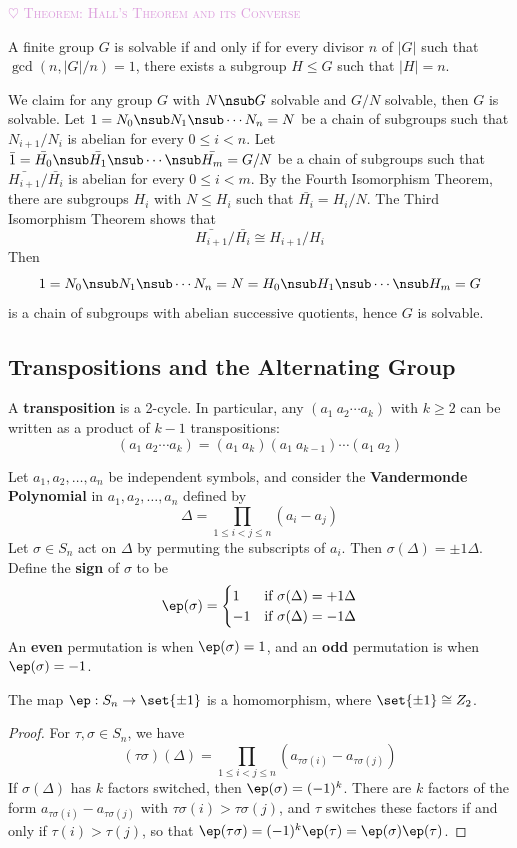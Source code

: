 \noindent \textcolor{Plum}{{\large$\heartsuit$} \squad \textsc{Theorem: Hall's Theorem and its Converse}}

A finite group $G$ is solvable if and only if for every divisor $n$ of $|G|$ such that $\gcd(n, |G|/n) = 1$, there exists a subgroup $H \leq G$ such that $|H| = n$.

\ex We claim for any group $G$ with $N \nsub G$ solvable and $G/N$ solvable, then $G$ is solvable. Let $1 = N_0 \nsub N_1 \nsub \cdots N_n = N$ be a chain of subgroups such that $N_{i + 1}/N_i$ is abelian for every $0 \leq i < n$. Let $\bar 1 = \bar{H_0} \nsub \bar{H_1} \nsub \cdots \nsub \bar{H_m} = G/N$ be a chain of subgroups such that $\bar{H_{i + 1}}/\bar{H_i}$ is abelian for every $0 \leq i < m$. By the Fourth Isomorphism Theorem, there are subgroups $H_i$ with $N \leq H_i$ such that $\bar{H_i} = H_i/N$. The Third Isomorphism Theorem shows that
\[\bar{H_{i + 1}}/\bar{H_i} \cong H_{i + 1}/H_i\]
Then
\[1 = N_0 \nsub N_1 \nsub \cdots N_n = N = H_0 \nsub H_1 \nsub \cdots \nsub H_m = G\]
is a chain of subgroups with abelian successive quotients, hence $G$ is solvable.

\newpage

\subsection{Transpositions and the Alternating Group} \label{sec3.5}

 A \textbf{transposition} is a 2-cycle. In particular, any $(a_1\ a_2 \cdots a_k)$ with $k \geq 2$ can be written as a product of $k - 1$ transpositions:
\[(a_1\ a_2 \cdots a_k) = (a_1\ a_k)(a_1\ a_{k - 1}) \cdots (a_1\ a_2)\]

 Let $a_1, a_2, \ldots, a_n$ be independent symbols, and consider the \textbf{Vandermonde Polynomial} in $a_1, a_2, \ldots, a_n$ defined by
\[\Delta = \prod_{1 \leq i < j \leq n} (a_i - a_j)\]
Let $\sigma \in S_n$ act on $\Delta$ by permuting the subscripts of $a_i$. Then $\sigma(\Delta) = \pm 1 \Delta$. Define the \textbf{sign} of $\sigma$ to be
\[\ep(\sigma) =
\begin{cases}
    1 & \text{if $\sigma(\Delta) = +1 \Delta$} \\
    -1 & \text{if $\sigma(\Delta) = -1 \Delta$}
\end{cases}\]
An \textbf{even} permutation is when $\ep(\sigma) = 1$, and an \textbf{odd} permutation is when $\ep(\sigma) = -1$.

 \label{prop3.23}
The map $\ep : S_n \to \set{\pm 1}$ is a homomorphism, where $\set{\pm 1} \cong Z_2$.
\begin{proof}
    For $\tau, \sigma \in S_n$, we have
    \[(\tau\sigma)(\Delta) = \prod_{1 \leq i < j \leq n}(a_{\tau\sigma(i)} - a_{\tau\sigma(j)})\]
    If $\sigma(\Delta)$ has $k$ factors switched, then $\ep(\sigma) = (-1)^k$. There are $k$ factors of the form $a_{\tau\sigma(i)} - a_{\tau\sigma(j)}$ with $\tau\sigma(i) > \tau\sigma(j)$, and $\tau$ switches these factors if and only if $\tau(i) > \tau(j)$, so that $\ep(\tau\sigma) = (-1)^k\ep(\tau) = \ep(\sigma)\ep(\tau)$.
\end{proof}

